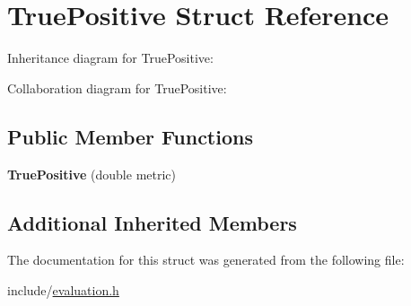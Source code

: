 \hypertarget{structTruePositive}{}\section{True\+Positive Struct Reference}
\label{structTruePositive}


Inheritance diagram for True\+Positive\+:


Collaboration diagram for True\+Positive\+:
\subsection*{Public Member Functions}
\begin{DoxyCompactItemize}
\item 
\mbox{\label{structTruePositive_aeedff5643bcee09ef41f536dcc06e292}} 
{\bfseries True\+Positive} (double metric)
\end{DoxyCompactItemize}
\subsection*{Additional Inherited Members}


The documentation for this struct was generated from the following file\+:\begin{DoxyCompactItemize}
\item 
include/\hyperlink{evaluation_8h}{evaluation.\+h}\end{DoxyCompactItemize}
